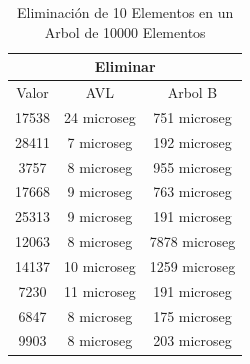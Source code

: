 \documentclass[acmsmall]{acmart}
\begin{document}
\begin{table}[htbp]
\begin{center}
  \caption{Eliminación de 10 Elementos en un Arbol de 10000 Elementos}
  \begin{tabular}{ccc}
    \toprule
    \multicolumn{3}{c}{Eliminar}\\
    \midrule
     Valor & AVL & Arbol B\\
      17538 &24 microseg&751 microseg \\
      28411 &7 microseg&192 microseg \\
      3757 &8 microseg&955 microseg \\
      17668 &9 microseg&763 microseg \\
      25313 &9 microseg&191 microseg \\
      12063 &8 microseg&7878 microseg \\
      14137 &10 microseg&1259 microseg \\
      7230 &11 microseg&191 microseg \\
       6847 &8 microseg&175 microseg \\
      9903 &8 microseg&203 microseg \\

    \bottomrule
  \end{tabular}
  \end{center}
\end{table}
\clearpage
\end{document}
